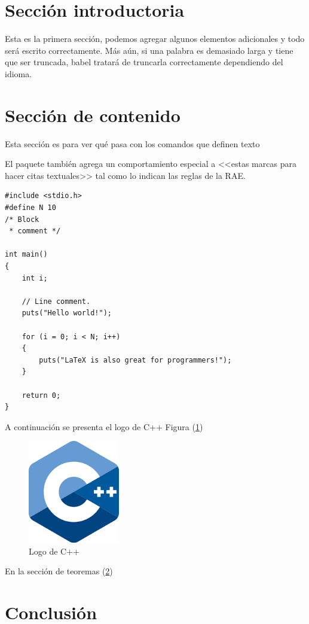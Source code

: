 \documentclass{article}
\begin{document}
\section{Sección introductoria}
Esta es la primera sección, podemos agregar algunos elementos adicionales y todo será escrito correctamente. Más aún, si una palabra es demasiado larga y tiene que ser truncada, babel tratará de truncarla correctamente dependiendo del idioma.

\section{Sección de contenido} \label{contenido}

Esta sección es para ver qué pasa con los comandos 
que definen texto

El paquete también agrega un comportamiento especial 
a <<estas marcas para hacer citas textuales>> tal como 
lo indican las reglas de la RAE. \cite{dirac}

\begin{lstlisting}
#include <stdio.h>
#define N 10
/* Block
 * comment */

int main()
{
    int i;

    // Line comment.
    puts("Hello world!");
    
    for (i = 0; i < N; i++)
    {
        puts("LaTeX is also great for programmers!");
    }

    return 0;
}
\end{lstlisting}

A continuación se presenta el logo de C++ Figura (\ref{fig:cpplogo})

\begin{figure}[htp]
\includegraphics[width=4cm]{cpplogo.png}
\centering
\caption{Logo de C++}
\label{fig:cpplogo}
\end{figure}

En la sección de teoremas (\ref{contenido})

\section{Conclusión} \label{conclulsion}
\end{document}
